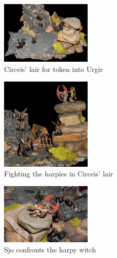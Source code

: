 \begin{figure}[h]
	\centering
	\includegraphics[width=0.39\textwidth]{images/Circeis-lair-for-token-into-Urgir-587600250.jpg}
	\caption{Circeis' lair for token into Urgir}
	\label{fig:Circeis-lair-for-token-into-Urgir-587600250}
\end{figure}

\begin{figure}[h]
	\centering
	\includegraphics[width=0.39\textwidth]{images/Fighting-the-harpies-in-Circeis-lair-587601733.jpg}
	\caption{Fighting the harpies in Circeis' lair}
	\label{fig:Fighting-the-harpies-in-Circeis-lair-587601733}
\end{figure}

\begin{figure}[h]
	\centering
	\includegraphics[width=0.39\textwidth]{images/Sjo-confonts-the-harpy-witch-587602339.jpg}
	\caption{Sjo confronts the harpy witch}
	\label{fig:Sjo-confonts-the-harpy-witch-587602339}
\end{figure}

